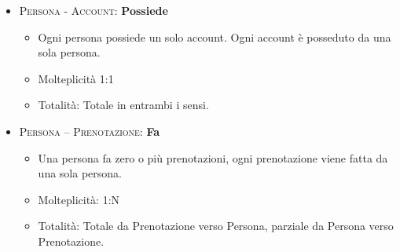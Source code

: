 \begin{itemize}
\item \textsc{Persona - Account:} \textbf{Possiede}
\begin{itemize}
\item Ogni persona possiede un solo account. Ogni account è posseduto da una sola persona.
\item Molteplicità 1:1
\item Totalità: Totale in entrambi i sensi.
\end{itemize}

\item \textsc{Persona – Prenotazione:} \textbf{Fa}
\begin{itemize}
\item Una persona fa zero o più prenotazioni, ogni prenotazione viene fatta da una sola persona.
\item Molteplicità: 1:N
\item Totalità: Totale da Prenotazione verso Persona, parziale da Persona verso Prenotazione.
\end{itemize}


\end{itemize}
